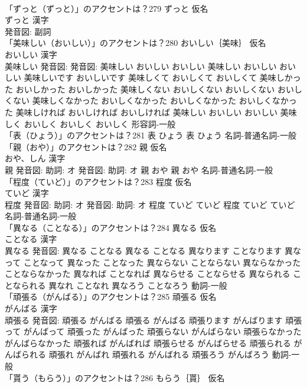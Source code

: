 \documentclass[8pt]{extreport}
\begin{document}
\begin{CJK}{UTF8}{min}
\\	「ずっと（ずっと）」のアクセントは？279	ずっと 仮名　
\\	ずっと 漢字　
\\	発音図:							副詞 
\\	「美味しい（おいしい）」のアクセントは？280	おいしい｛美味｝ 仮名　
\\	おいしい 漢字　
\\	美味しい 発音図: 発音図:	美味しい おいしい おいしい		美味しい おいしい おいしい 美味しいです おいしいです 美味しくて おいしくて おいしくて 美味しかった おいしかった おいしかった 美味しくない おいしくない おいしくない おいしくない 美味しくなかった おいしくなかった おいしくなかった おいしくなかった 美味しければ おいしければ おいしければ 美味しい おいしい おいしい 美味しく おいしく おいしく おいしく				形容詞-一般 
\\	「表（ひょう）」のアクセントは？281		表 ひょう		表 ひょう				名詞-普通名詞-一般 
\\	「親（おや）」のアクセントは？282	親 仮名　
\\	おや、しん 漢字　
\\	親 発音図: 助詞: オ 発音図: 助詞: オ	親 おや		親 おや				名詞-普通名詞-一般 
\\	「程度（ていど）」のアクセントは？283	程度 仮名　
\\	ていど 漢字　
\\	程度 発音図: 助詞: オ 発音図: 助詞: オ	程度 ていど ていど		程度 ていど ていど				名詞-普通名詞-一般 
\\	「異なる（ことなる）」のアクセントは？284	異なる 仮名　
\\	ことなる 漢字　
\\	異なる 発音図:	異なる ことなる		異なる ことなる 異なります ことなります 異なって ことなって 異なった ことなった 異ならない ことならない 異ならなかった ことならなかった 異なれば ことなれば 異ならせる ことならせる 異なられる ことなられる 異なれ ことなれ 異なろう ことなろう				動詞-一般 
\\	「頑張る（がんばる）」のアクセントは？285	頑張る 仮名　
\\	がんばる 漢字　
\\	頑張る 発音図:	頑張る がんばる		頑張る がんばる 頑張ります がんばります 頑張って がんばって 頑張った がんばった 頑張らない がんばらない 頑張らなかった がんばらなかった 頑張れば がんばれば 頑張らせる がんばらせる 頑張られる がんばられる 頑張れ がんばれ 頑張れる がんばれる 頑張ろう がんばろう				動詞-一般 
\\	「貰う（もらう）」のアクセントは？286	もらう｛貰｝ 仮名　

\end{CJK}
\end{document}
